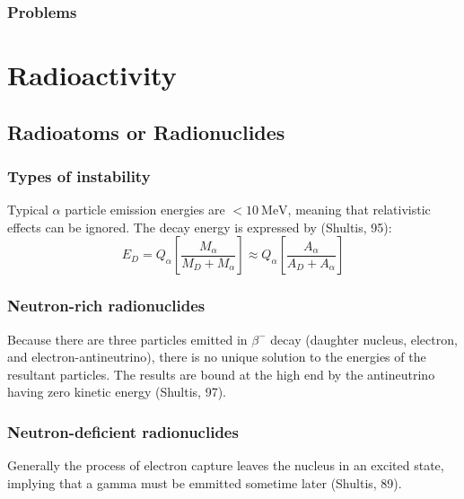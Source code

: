 \documentclass{article}
\begin{document}
\subsubsection{Problems}

\newpage

\section{Radioactivity}

\subsection{Radioatoms or Radionuclides}

\subsubsection{Types of instability}
Typical $\alpha$ particle emission energies are $<\SI{10}{\mega\electronvolt}$, meaning that relativistic effects can be ignored. The decay energy is expressed by (Shultis, 95): $$ E_D = Q_\alpha \left[ \frac{M_\alpha}{M_D + M_\alpha} \right] \approx Q_\alpha \left[\frac{A_\alpha}{A_D + A_\alpha} \right] $$

\subsubsection{Neutron-rich radionuclides}
Because there are three particles emitted in $ \beta^- $ decay (daughter nucleus, electron, and electron-antineutrino), there is no unique solution to the energies of the resultant particles. The results are bound at the high end by the antineutrino having zero kinetic energy (Shultis, 97).

\newpage

\subsubsection{Neutron-deficient radionuclides}
Generally the process of electron capture leaves the nucleus in an excited state, implying that a gamma must be emmitted sometime later (Shultis, 89).
\end{document}
